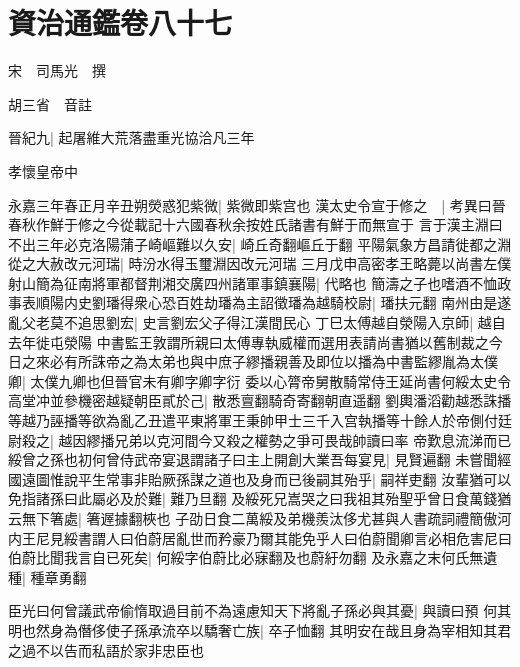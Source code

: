 \chapter{資治通鑑卷八十七}
宋　司馬光　撰

胡三省　音註

晉紀九|{
	起屠維大荒落盡重光協洽凡三年}


孝懷皇帝中

永嘉三年春正月辛丑朔熒惑犯紫微|{
	紫微即紫宫也}
漢太史令宣于修之　|{
	考異曰晉春秋作鮮于修之今從載記十六國春秋余按姓氏諸書有鮮于而無宣于}
言于漢主淵曰不出三年必克洛陽蒲子崎嶇難以久安|{
	崎丘奇翻嶇丘于翻}
平陽氣象方昌請徙都之淵從之大赦改元河瑞|{
	時汾水得玉璽淵因改元河瑞}
三月戊申高密孝王略薨以尚書左僕射山簡為征南將軍都督荆湘交廣四州諸軍事鎮襄陽|{
	代略也}
簡濤之子也嗜酒不恤政事表順陽内史劉璠得衆心恐百姓劫璠為主詔徵璠為越騎校尉|{
	璠扶元翻}
南州由是遂亂父老莫不追思劉宏|{
	史言劉宏父子得江漢間民心}
丁巳太傅越自滎陽入京師|{
	越自去年徙屯滎陽}
中書監王敦謂所親曰太傅專執威權而選用表請尚書猶以舊制裁之今日之來必有所誅帝之為太弟也與中庶子繆播親善及即位以播為中書監繆胤為太僕卿|{
	太僕九卿也但晉官未有卿字卿字衍}
委以心膂帝舅散騎常侍王延尚書何綏太史令高堂冲並參機密越疑朝臣貳於己|{
	散悉亶翻騎奇寄翻朝直遥翻}
劉輿潘滔勸越悉誅播等越乃誣播等欲為亂乙丑遣平東將軍王秉帥甲士三千入宫執播等十餘人於帝側付廷尉殺之|{
	越因繆播兄弟以克河間今又殺之權勢之爭可畏哉帥讀曰率}
帝歎息流涕而已綏曾之孫也初何曾侍武帝宴退謂諸子曰主上開創大業吾每宴見|{
	見賢遍翻}
未嘗聞經國遠圖惟說平生常事非貽厥孫謀之道也及身而已後嗣其殆乎|{
	嗣祥吏翻}
汝輩猶可以免指諸孫曰此屬必及於難|{
	難乃旦翻}
及綏死兄嵩哭之曰我祖其殆聖乎曾日食萬錢猶云無下箸處|{
	箸遟據翻梜也}
子劭日食二萬綏及弟機羨汰侈尤甚與人書疏詞禮簡傲河内王尼見綏書謂人曰伯蔚居亂世而矜豪乃爾其能免乎人曰伯蔚聞卿言必相危害尼曰伯蔚比聞我言自已死矣|{
	何綏字伯蔚比必寐翻及也蔚紆勿翻}
及永嘉之末何氏無遺種|{
	種章勇翻}


臣光曰何曾議武帝偷惰取過目前不為遠慮知天下將亂子孫必與其憂|{
	與讀曰預}
何其明也然身為僭侈使子孫承流卒以驕奢亡族|{
	卒子恤翻}
其明安在哉且身為宰相知其君之過不以告而私語於家非忠臣也

